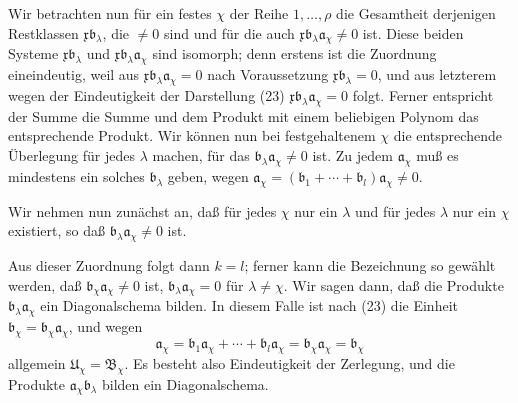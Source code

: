 \documentclass[11pt]{article}
\newcommand{\mB}{\mathfrak{B}}
\newcommand{\ma}{\mathfrak{a}}
\newcommand{\mb}{\mathfrak{b}}
\newcommand{\mx}{\mathfrak{x}}
\newcommand{\mU}{\mathfrak{U}}
\begin{document}
Wir betrachten nun für ein festes $\chi$ der Reihe $1,
\ldots,\rho$ die Gesamtheit derjenigen Restklassen $\mx\mb_\lambda$, die $\ne0$ sind und für die auch $\mx\mb_\lambda\ma_\chi\ne0$ ist. Diese beiden Systeme $\mx\mb_\lambda$ und $\mx\mb_\lambda\ma_\chi$ sind isomorph; denn erstens ist die Zuordnung eineindeutig, weil aus $\mx\mb_\lambda\ma_\chi=0$ nach Voraussetzung $\mx\mb_\lambda=0$, und aus letzterem wegen der Eindeutigkeit der Darstellung (23) $\mx\mb_\lambda\ma_\chi=0$ folgt. Ferner entspricht der Summe die Summe und dem Produkt mit einem beliebigen Polynom das entsprechende Produkt. Wir können nun bei festgehaltenem $\chi$ die entsprechende Überlegung für jedes $\lambda$ machen, für das $\mb_\lambda\ma_\chi\ne0$ ist. Zu jedem $\ma_\chi$ muß es mindestens ein solches $\mb_\lambda$ geben, wegen $\ma_\chi=(\mb_1+
\cdots+\mb_l)\ma_\chi\ne0$.

Wir nehmen nun zunächst an, daß für jedes $\chi$ nur ein $\lambda$ und für jedes $\lambda$ nur ein $\chi$ existiert, so daß $\mb_\lambda\ma_\chi\ne0$ ist.

Aus dieser Zuordnung folgt dann $k=l$; ferner kann die Bezeichnung so gewählt werden, daß $\mb_\chi\ma_\chi\ne0$ ist, $\mb_\lambda\ma_\chi=0$ für $\lambda\ne\chi$. Wir sagen dann, daß die Produkte $\mb_\lambda\ma_\chi$ ein Diagonalschema bilden. In diesem Falle ist nach (23) die Einheit $\mb_\chi=\mb_\chi\ma_\chi$, und wegen
\begin{equation}
 \ma_\chi=\mb_1\ma_\chi+\cdots+\mb_l\ma_\chi=\mb_\chi\ma_\chi=\mb_\chi
\tag{24}
\end{equation}
allgemein $\mU_\chi=\mB_\chi$. Es besteht also Eindeutigkeit der Zerlegung, und die Produkte $\ma_\chi\mb_\lambda$ bilden ein Diagonalschema.
\end{document}
